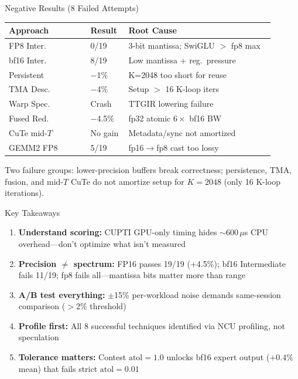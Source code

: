 \documentclass[final,t]{beamer}
\newlength{\colsep}
\newlength{\colheight}
\begin{document}
\begin{frame}[t]
\begin{minipage}[t]{0.265\textwidth}
\begin{minipage}[t][\colheight][t]{\textwidth}
\end{minipage}
\end{minipage}%
\hspace{\colsep}%
\begin{minipage}[t]{0.225\textwidth}
\begin{minipage}[t][\colheight][t]{\textwidth}

\begin{block}{Negative Results (8 Failed Attempts)}
\small
\begin{tabular}{@{}p{0.28\linewidth}p{0.12\linewidth}p{0.50\linewidth}@{}}
\toprule
\textbf{Approach} & \textbf{Result} & \textbf{Root Cause} \\
\midrule
FP8 Inter. & 0/19 & 3-bit mantissa; SwiGLU $>$ fp8 max \\[2pt]
bf16 Inter. & 8/19 & Low mantissa + reg.\ pressure \\[2pt]
Persistent & $-$1\% & K=2048 too short for reuse \\[2pt]
TMA Desc. & $-$4\% & Setup $>$ 16 K-loop iters \\[2pt]
Warp Spec. & Crash & TTGIR lowering failure \\[2pt]
Fused Red. & $-$4.5\% & fp32 atomic $6\times$ bf16 BW \\[2pt]
CuTe mid-$T$ & No gain & Metadata/sync not amortized \\[2pt]
GEMM2 FP8 & 5/19 & fp16$\to$fp8 cast too lossy \\
\bottomrule
\end{tabular}
\normalsize
\vspace{4pt}

Two failure groups: lower-precision buffers break correctness; persistence, TMA, fusion, and mid-$T$ CuTe do not amortize setup for $K{=}2048$ (only 16 K-loop iterations).
\end{block}

\begin{block}{Key Takeaways}
\begin{enumerate}
\item \textbf{Understand scoring:} CUPTI GPU-only timing hides ${\sim}600\,\mu$s CPU overhead---don't optimize what isn't measured
\item \textbf{Precision $\ne$ spectrum:} FP16 passes 19/19 (+4.5\%); bf16 Intermediate fails 11/19; fp8 fails all---mantissa bits matter more than range
\item \textbf{A/B test everything:} $\pm$15\% per-workload noise demands same-session comparison ($>$2\% threshold)
\item \textbf{Profile first:} All 8 successful techniques identified via NCU profiling, not speculation
\item \textbf{Tolerance matters:} Contest $\text{atol}{=}1.0$ unlocks bf16 expert output ($+0.4\%$ mean) that fails strict $\text{atol}{=}0.01$
\end{enumerate}
\end{block}


\end{minipage}
\end{minipage}
\end{frame}
\end{document}
